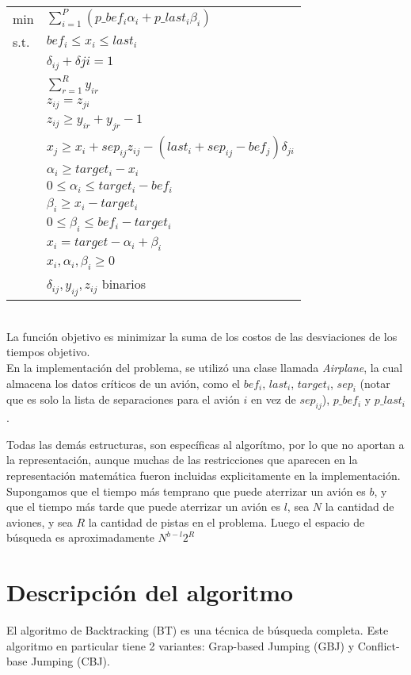 \documentclass[letter, 11pt]{article}
\begin{document}
\begin{tabular}{l l}
min &  $\sum_{i=1}^{P} {(p\_bef_i\alpha_i + p\_last_i\beta_i)}$\\
s.t. & $bef_i \leq x_i \leq last_i$ \\
& $\delta_{ij} + \delta{ji} = 1$ \\
& $\sum_{r=1}^{R} {y_{ir}}$\\
& $z_{ij} = z_{ji}$ \\
& $z_{ij} \geq y_{ir} + y_{jr} - 1$ \\
& $x_j \geq x_i + sep_{ij}z_{ij} - (last_i + sep_{ij} - bef_j)\delta_{ji}$ \\
& $\alpha_i \geq target_i - x_i$ \\
& $0 \leq \alpha_i \leq target_i - bef_i$  \\
& $\beta_i \geq x_i - target_i$ \\
& $0 \leq \beta_i \leq bef_i - target_i$ \\
& $x_i = target - \alpha_i + \beta_i$ \\
& $x_i, \alpha_i, \beta_i \geq 0$ \\
& $\delta_{ij}, y_{ij}, z_{ij}$ binarios
\end{tabular}
\\

La función objetivo es minimizar la suma de los costos de las desviaciones de los tiempos objetivo.
\\

En la implementación del problema, se utilizó una clase llamada \textit{Airplane}, la cual almacena los datos críticos de un avión, como el $bef_i$, $last_i$, $target_i$, $sep_i$ (notar que es solo la lista de separaciones para el avión $i$ en vez de $sep_{ij}$), $p\_bef_i$ y $p\_last_i$.

Todas las demás estructuras, son específicas al algorítmo, por lo que no aportan a la representación, aunque muchas de las restricciones que aparecen en la representación matemática fueron incluidas explicitamente en la implementación.
\\

Supongamos que el tiempo más temprano que puede aterrizar un avión es $b$, y que el tiempo más tarde que puede aterrizar un avión es $l$, sea $N$ la cantidad de aviones, y sea $R$ la cantidad de pistas en el problema. Luego el espacio de búsqueda es aproximadamente $N^{b-l}2^R$ 

\section{Descripci\'on del algoritmo}
El algoritmo de Backtracking (BT) es una técnica de búsqueda completa. Este algoritmo en particular tiene 2 variantes: Grap-based Jumping (GBJ) y Conflict-base Jumping (CBJ).
\end{document}
